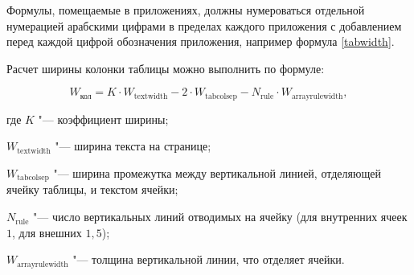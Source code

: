 
Формулы, помещаемые в приложениях, должны нумероваться отдельной
нумерацией арабскими цифрами в пределах каждого приложения с
добавлением перед каждой цифрой обозначения приложения, например
формула \eqref{tabwidth}.

Расчет ширины колонки таблицы можно выполнить по формуле:

\begin{equation}
\label{tabwidth}
W_\text{кол} = K \cdot W_\text{textwidth} - 2 \cdot W_\text{tabcolsep}
- N_\text{rule} \cdot W_\text{arrayrulewidth},
\end{equation}

\begin{ESKDexplanation}
\item[где ] $K$ "--- коэффициент ширины;
\item $W_\text{textwidth}$ "--- ширина текста на странице;
\item $W_\text{tabcolsep}$ "--- ширина промежутка между
вертикальной линией, отделяющей ячейку таблицы, и текстом ячейки;
\item $N_\text{rule}$ "--- число вертикальных линий отводимых на
ячейку (для внутренних ячеек $1$, для внешних $1{,}5$);
\item $W_\text{arrayrulewidth}$ "--- толщина вертикальной линии, что
отделяет ячейки.
\end{ESKDexplanation}




\newpage

